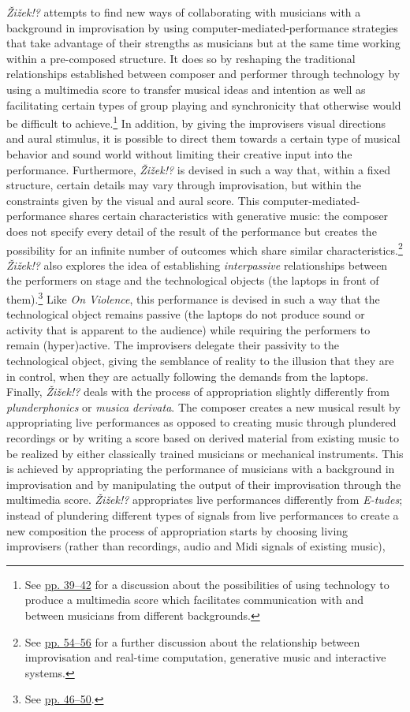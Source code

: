 \emph{\v{Z}i\v{z}ek!?} attempts to find new ways of collaborating with musicians with a background in improvisation by using computer-mediated-performance strategies that take advantage of their strengths as musicians but at the same time working within a pre-composed structure. It does so by reshaping the traditional relationships established between composer and performer through technology by using a multimedia score to transfer musical ideas and intention as well as facilitating certain types of group playing and synchronicity that otherwise would be difficult to achieve.\footnote{See \hyperlink{superscore}{pp. 39--42} for a discussion about the possibilities of using technology to produce a multimedia score which facilitates communication with and between musicians from different backgrounds.} In addition, by giving the improvisers visual directions and aural stimulus, it is possible to direct them towards a certain type of musical behavior and sound world without limiting their creative input into the performance. Furthermore, \emph{\v{Z}i\v{z}ek!?} is devised in such a way that, within a fixed structure, certain details may vary through improvisation, but within the constraints given by the visual and aural score. This computer-mediated-performance shares certain characteristics with generative music: the composer does not specify every detail of the result of the performance but creates the possibility for an infinite number of outcomes which share similar characteristics.\footnote{See \hyperlink{realtimepos}{pp. 54--56} for a further discussion about the relationship between improvisation and real-time computation, generative music and interactive systems.} \emph{\v{Z}i\v{z}ek!?} also explores the idea of establishing \emph{interpassive} relationships between the performers on stage and the technological objects (the laptops in front of them).\footnote{See \hyperlink{interpassiv}{pp. 46--50}.} Like \emph{On Violence}, this performance is devised in such a way that the technological object remains passive (the laptops do not produce sound or activity that is apparent to the audience) while requiring the performers to remain (hyper)active. The improvisers delegate their passivity to the technological object, giving the semblance of reality to the illusion that they are in control, when they are actually following the demands from the laptops. Finally, \emph{\v{Z}i\v{z}ek!?} deals with the process of appropriation slightly differently from \emph{plunderphonics} or \emph{musica derivata}. The composer creates a new musical result by appropriating live performances as opposed to creating music through plundered recordings or by writing a score based on derived material from existing music to be realized by either classically trained musicians or mechanical instruments. This is achieved by appropriating the performance of musicians with a background in improvisation and by manipulating the output of their improvisation through the multimedia score. \emph{\v{Z}i\v{z}ek!?} appropriates live performances differently from \emph{E-tudes}; instead of plundering different types of signals from live performances to create a new composition the process of appropriation starts by choosing living improvisers (rather than recordings, audio and Midi signals of existing music), 